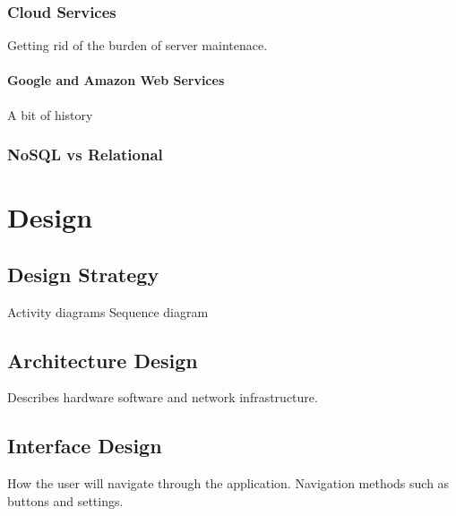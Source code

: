 \documentclass[a4paper, 11pt]{article}
\begin{document}
\subsubsection{Cloud Services} 
Getting rid of the burden of server maintenace. 
\paragraph{Google and Amazon Web Services}
A bit of history


\subsubsection{NoSQL vs Relational}

\clearpage

\section{Design}

\subsection{Design Strategy}

Activity diagrams
Sequence diagram

\subsection{Architecture Design} Describes hardware software and network infrastructure. 
\subsection{Interface Design} How the user will navigate through the application. Navigation methods such as buttons and settings.
\end{document}
